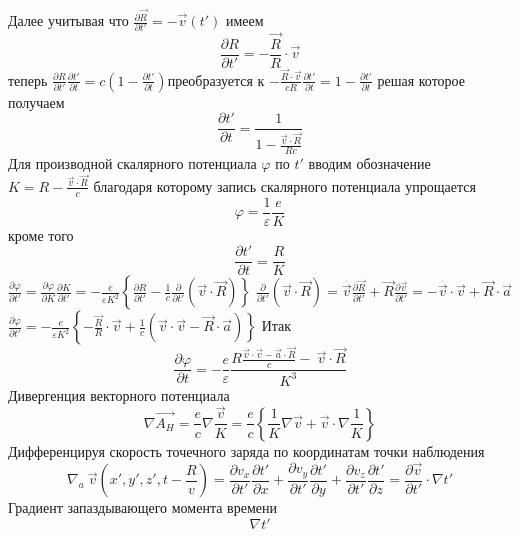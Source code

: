 \documentclass[11pt]{article}
\begin{document}
Далее учитывая что
\(\frac{\partial \overrightarrow{R}}{\partial t'}=-\overrightarrow{v}\left( t' \right)\)
имеем
\[\frac{\partial R}{\partial t'}=-\frac{\overrightarrow{R}}{R}\cdot \overrightarrow{v}\]
теперь
\(\frac{\partial R}{\partial t'}\frac{\partial t'}{\partial t}=c\left( 1-\frac{\partial t'}{\partial t} \right)\)преобразуется
к
\(-\frac{\overrightarrow{R}\cdot \overrightarrow{v}}{cR}\frac{\partial t'}{\partial t}=1-\frac{\partial t'}{\partial t}\)
решая которое получаем
\[\frac{\partial t'}{\partial t}=\frac{1}{1-\frac{\overrightarrow{v}\cdot \overrightarrow{R}}{Rc}}\]
Для производной скалярного потенциала $\varphi$ по \(t'\) вводим
обозначение \(K=R-\frac{\overrightarrow{v}\cdot \overrightarrow{R}}{c}\)
благодаря которому запись скалярного потенциала упрощается
\[\varphi =\frac{1}{\varepsilon }\frac{e}{K}\] кроме того
\[\frac{\partial t'}{\partial t}=\frac{R}{K}\]
\(\frac{\partial \varphi }{\partial t'}=\frac{\partial \varphi }{\partial K}\frac{\partial K}{\partial t'}=-\frac{e}{\varepsilon {{K}^{2}}}\left\{ \frac{\partial R}{\partial t'}-\frac{1}{c}\frac{\partial }{\partial t'}\left( \overrightarrow{v}\cdot \overrightarrow{R} \right) \right\}\)
\(\frac{\partial }{\partial t'}\left( \overrightarrow{v}\cdot \overrightarrow{R} \right)=\overrightarrow{v}\frac{\partial \overrightarrow{R}}{\partial t'}+\overrightarrow{R}\frac{\partial \overrightarrow{v}}{\partial t'}=-\overrightarrow{v}\cdot \overrightarrow{v}+\overrightarrow{R}\cdot \overrightarrow{a}\)
\(\frac{\partial \varphi }{\partial t'}=-\frac{e}{\varepsilon {{K}^{2}}}\left\{ -\frac{\overrightarrow{R}}{R}\cdot \overrightarrow{v}+\frac{1}{c}\left( \overrightarrow{v}\cdot \overrightarrow{v}-\overrightarrow{R}\cdot \overrightarrow{a} \right) \right\}\)
Итак
\[\frac{\partial \varphi }{\partial t}=-\frac{e}{\varepsilon }\frac{R\frac{\vec{v}\cdot \vec{v}-\overrightarrow{a}\cdot \overrightarrow{R}}{c}-~\overrightarrow{v}\cdot \overrightarrow{R}}{{{K}^{3}}}\]
Дивергенция векторного потенциала
\[\nabla \overrightarrow{{{A}_{H}}}=\frac{e}{c}\nabla \frac{\overrightarrow{v}}{K}=\frac{e}{c}\left\{ \frac{1}{K}\nabla \overrightarrow{v}+\overrightarrow{v}\cdot \nabla \frac{1}{K} \right\}\]
Дифференцируя скорость точечного заряда по координатам точки наблюдения
\[{{\nabla }_{a}}\ \overrightarrow{v}\left( x',y',z',t-\frac{R}{v} \right)=\frac{\partial {{v}_{x}}}{\partial t'}\frac{\partial t'}{\partial x}+\frac{\partial {{v}_{y}}}{\partial t'}\frac{\partial t'}{\partial y}+\frac{\partial {{v}_{z}}}{\partial t'}\frac{\partial t'}{\partial z}=\frac{\partial \overrightarrow{v}}{\partial t'}\cdot \nabla t'\]
Градиент запаздывающего момента времени \[\nabla t'\]
\end{document}
